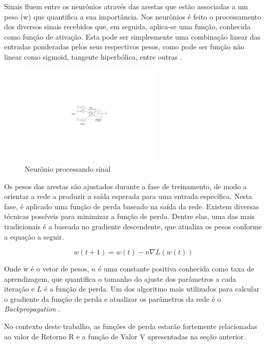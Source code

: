 Sinais fluem entre os neurônios através das arestas que estão associadas a um peso (w) que quantifica a sua importância. 
Nos neurônios é feito o processamento dos diversos sinais recebidos que, em seguida, aplica-se uma função, conhecida como função de ativação. 
Esta pode ser simplesmente uma combinação linear das entradas ponderadas pelos seus respectivos pesos, como pode ser função não linear como  sigmoid, 
tangente hiperbólica, entre outras \cite{Bishop}.   

\begin{figure}[H]
     \centering
     \includegraphics[width=0.6\textwidth]{figuras/ActivationFunc.pdf}
     \caption{Neurônio processando sinal \cite{Figueiredo}}
\end{figure}

Os pesos das arestas são ajustados durante a fase de treinamento,  de modo a orientar a rede a produzir a saída esperada para uma entrada específica. 
Nesta fase, é aplicado uma função de perda baseado na saída da rede. 
Existem diversas técnicas possíveis para minimizar a função de perda. 
Dentre elas, uma das mais tradicionais é a baseada no gradiente descendente, que atualiza os pesos conforme a equação a seguir. 

\begin{equation}
    w(t +1) = w(t) - n\nabla L(w(t)) 
\end{equation}

Onde w é o vetor de pesos, $n$ é uma constante positiva conhecida como taxa de aprendizagem, 
que quantifica o tamanho do ajuste dos parâmetros a cada iteração e $L$ é a função de perda. 
Um dos algoritmo mais utilizados para calcular o gradiente da função de perda e atualizar os parâmetros da rede é o \textit{Backpropagation} \cite{Bishop}. 

No contexto deste trabalho, as funções de perda estarão fortemente relacionadas ao valor de Retorno R e a função de Valor V apresentadas na seção anterior. 


